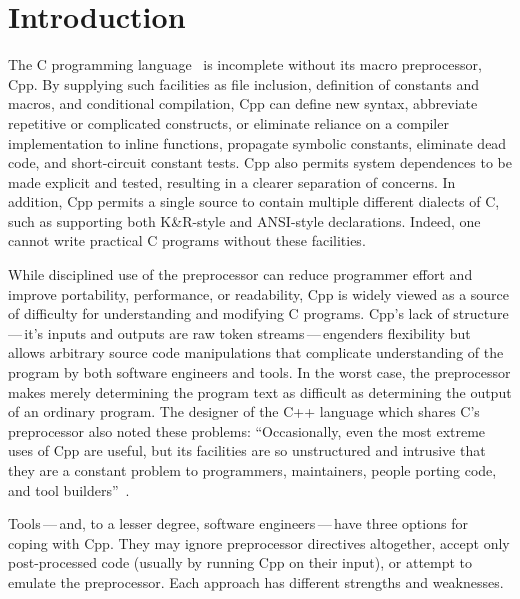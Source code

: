 \documentclass[10pt]{article}
\begin{document}
\section{Introduction}

The C programming language~\cite{KernighanR88,Harbison91} is incomplete
without its macro preprocessor, Cpp.  By supplying such facilities as file
inclusion, definition of constants and macros, and conditional compilation,
Cpp can define new syntax, abbreviate repetitive or complicated constructs,
or eliminate reliance on a compiler implementation to inline functions,
propagate symbolic constants, eliminate dead code, and short-circuit
constant tests.  Cpp also permits system dependences to be made explicit
and tested, resulting in a clearer separation of concerns.  In addition,
Cpp permits a single source to contain multiple different dialects of C,
such as supporting both K\&R-style and ANSI-style declarations.  Indeed,
one cannot write practical C programs without these facilities.

While disciplined use of the preprocessor can reduce programmer effort
and improve portability, performance, or readability, Cpp is widely
viewed as a source of difficulty for understanding and modifying C
programs.  Cpp's lack of structure\,---\,it's inputs and
outputs are raw token streams\,---\,engenders flexibility but allows
arbitrary source code manipulations that complicate 
understanding of the program by both software engineers and tools.  In
the worst case, the preprocessor makes merely determining the program
text as difficult as determining the output of an ordinary program.
The designer of the C++ language which shares C's preprocessor also noted these
problems: ``Occasionally, even the most extreme uses of Cpp are
useful, but its facilities are so unstructured and intrusive that they
are a constant problem to programmers, maintainers, people porting
code, and tool builders''~\cite[p.~424]{Stroustrup-DesignEvolution}.

Tools\,---\,and, to a lesser degree, software engineers\,---\,have
three options for coping with Cpp.  They may ignore preprocessor
directives altogether, accept only post-processed code (usually by
running Cpp on their input), or attempt to emulate the preprocessor.
Each approach has different strengths and weaknesses.
\end{document}
